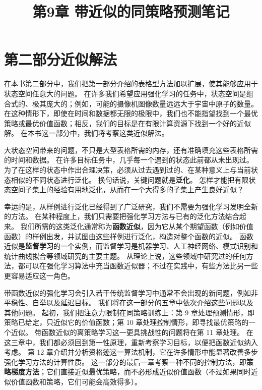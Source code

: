\documentclass[UTF8,12pt,a4paper,fontset=fandol]{ctexart}
\title{第9章 带近似的同策略预测笔记}
\author{}
\date{}
\begin{document}
\maketitle

\section*{第二部分\quad 近似解法}

在本书第二部分中，我们把第一部分介绍的表格型方法加以扩展，使其能够应用于状态空间任意大的问题。
在许多我们希望应用强化学习的任务中，状态空间是组合式的、极其庞大的；例如，可能的摄像机图像数量远远大于宇宙中原子的数量。
在这种情形下，即使在时间和数据都无限的极限中，我们也不能指望找到一个最优策略或最优价值函数；相反，我们的目标是在有限计算资源下找到一个好的近似解。
在本书这一部分中，我们将考察这类近似解法。

大状态空间带来的问题，不只是大型表格所需的内存，还有准确填充这些表格所需的时间和数据。
在许多目标任务中，几乎每一个遇到的状态此前都从未出现过。
为了在这样的状态中作出合理决策，必须从过去遇到过的、在某种意义上与当前状态相似的不同状态进行泛化。
换句话说，关键问题就是\textbf{泛化}。
怎样才能把有限状态空间子集上的经验有用地泛化，从而在一个大得多的子集上产生良好近似？

幸运的是，从样例进行泛化已经得到了广泛研究，我们不需要为强化学习发明全新的方法。
在某种程度上，我们只需要把强化学习方法与已有的泛化方法结合起来。
我们所需的这类泛化通常称为\textbf{函数近似}，因为它从某个期望函数（例如价值函数）的样例出发，并试图由这些样例进行泛化，构造对整个函数的近似。
函数近似是\textbf{监督学习}的一个实例，而监督学习是机器学习、人工神经网络、模式识别和统计曲线拟合等领域研究的主要主题。
从理论上说，这些领域中研究过的任何方法，都可以在强化学习算法中充当函数近似器；不过在实践中，有些方法比另一些更容易适应这一角色。

带函数近似的强化学习会引入若干传统监督学习中通常不会出现的新问题，例如非平稳性、自举以及延迟目标。
我们将在这一部分的五章中依次介绍这些问题以及其他问题。
起初，我们把注意力限制在同策略训练上：第 9 章处理预测情形，即策略已给定，只近似它的价值函数；第 10 章处理控制情形，即寻找最优策略的一个近似。
带函数近似的离策略学习这一更具挑战性的问题将在第 11 章处理。
在这三章中，我们都必须回到第一性原理，重新考察学习目标，以便把函数近似纳入考虑。
第 12 章介绍并分析资格迹这一算法机制，它在许多情形中能显著改善多步强化学习方法的计算性质。
这一部分的最后一章考察一种不同的控制方法，即\textbf{策略梯度方法}；它们直接近似最优策略，而不必形成近似价值函数（不过如果同时近似价值函数和策略，它们可能会高效得多）。
\end{document}
